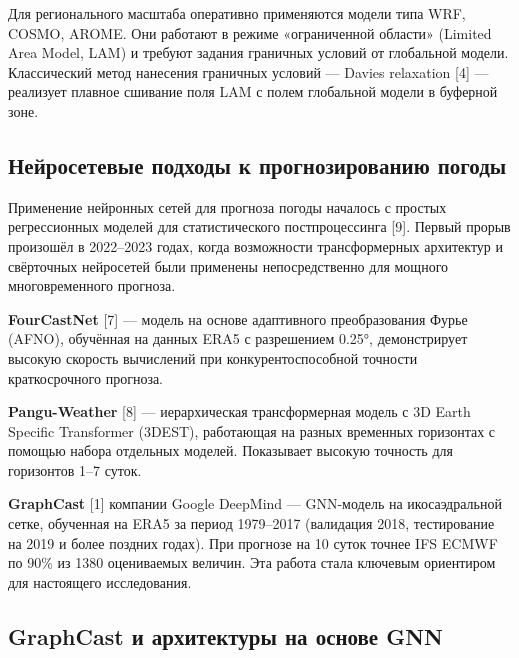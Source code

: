 \documentclass[14pt,a4paper]{extarticle}
\numberwithin{table}{section}
\numberwithin{figure}{section}
\numberwithin{equation}{section}
\begin{document}
Для регионального масштаба оперативно применяются модели типа WRF,
COSMO, AROME. Они работают в режиме «ограниченной области» (Limited Area
Model, LAM) и требуют задания граничных условий от глобальной модели.
Классический метод нанесения граничных условий --- Davies relaxation
{[}4{]} --- реализует плавное сшивание поля LAM с полем глобальной
модели в буферной зоне.

\subsection{Нейросетевые подходы к прогнозированию погоды}\label{ux43dux435ux439ux440ux43eux441ux435ux442ux435ux432ux44bux435-ux43fux43eux434ux445ux43eux434ux44b-ux43a-ux43fux440ux43eux433ux43dux43eux437ux438ux440ux43eux432ux430ux43dux438ux44e-ux43fux43eux433ux43eux434ux44b}

Применение нейронных сетей для прогноза погоды началось с простых
регрессионных моделей для статистического постпроцессинга {[}9{]}.
Первый прорыв произошёл в 2022--2023 годах, когда возможности
трансформерных архитектур и свёрточных нейросетей были применены
непосредственно для мощного многовременного прогноза.

\textbf{FourCastNet} {[}7{]} --- модель на основе адаптивного
преобразования Фурье (AFNO), обучённая на данных ERA5 с разрешением
0.25°, демонстрирует высокую скорость вычислений при конкурентоспособной
точности краткосрочного прогноза.

\textbf{Pangu-Weather} {[}8{]} --- иерархическая трансформерная модель с
3D Earth Specific Transformer (3DEST), работающая на разных временных
горизонтах с помощью набора отдельных моделей. Показывает высокую
точность для горизонтов 1--7 суток.

\textbf{GraphCast} {[}1{]} компании Google DeepMind --- GNN-модель на
икосаэдральной сетке, обученная на ERA5 за период 1979--2017 (валидация
2018, тестирование на 2019 и более поздних годах). При прогнозе на 10
суток точнее IFS ECMWF по 90\% из 1380 оцениваемых величин. Эта работа
стала ключевым ориентиром для настоящего исследования.

\subsection{GraphCast и архитектуры на основе GNN}\label{graphcast-ux438-ux430ux440ux445ux438ux442ux435ux43aux442ux443ux440ux44b-ux43dux430-ux43eux441ux43dux43eux432ux435-gnn}
\end{document}
